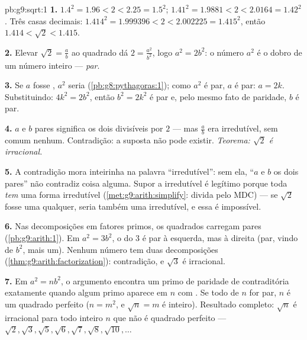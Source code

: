 \begin{solution}{pb:g9:sqrt:1}
\textbf{1.} $1.4^2 = 1.96 < 2 < 2.25 = 1.5^2$;
$1.41^2 = 1.9881 < 2 < 2.0164 = 1.42^2$. Três casas decimais:
$1.414^2 = 1.999396 < 2 < 2.002225 = 1.415^2$, então
$1.414 < \sqrt2 < 1.415$.

\textbf{2.} Elevar $\sqrt2 = \frac ab$ ao quadrado dá
$2 = \frac{a^2}{b^2}$, logo $a^2 = 2b^2$: o número $a^2$ é o dobro de
um número inteiro --- \emph{par}.

\textbf{3.} Se $a$ fosse , $a^2$ seria 
(\cref{pb:g8:pythagoras:1}); como $a^2$ é par, $a$ é par: $a = 2k$.
Substituindo: $4k^2 = 2b^2$, então $b^2 = 2k^2$ é par e, pelo mesmo
fato de paridade, $b$ é par.

\textbf{4.} $a$ e $b$ pares significa os dois divisíveis por $2$ ---
mas $\frac ab$ era irredutível, sem  comum nenhum.
Contradição: a  suposta não pode existir. \emph{Teorema:
$\sqrt2$ é irracional.}

\textbf{5.} A contradição mora inteirinha na palavra ``irredutível'':
sem ela, ``$a$ e $b$ os dois pares'' não contradiz coisa alguma. Supor
a  irredutível é legítimo porque toda  \emph{tem} uma forma
irredutível (\cref{met:g9:arith:simplify}: divida pelo MDC) --- se
$\sqrt2$ fosse uma  qualquer, seria também uma 
irredutível, e essa é impossível.

\textbf{6.} Nas decomposições em fatores primos, os quadrados carregam
 pares (\cref{pb:g9:arith:1}). Em $a^2 = 3b^2$, o  do
$3$ é par à esquerda, mas  à direita (par, vindo de $b^2$, mais
um). Nenhum número tem duas decomposições
(\cref{thm:g9:arith:factorization}): contradição, e $\sqrt3$ é
irracional.

\textbf{7.} Em $a^2 = n b^2$, o argumento encontra um primo de
paridade de  contraditória exatamente quando algum primo
aparece em $n$ com  \emph{}. Se todo  de $n$ for
par, $n$ é um quadrado perfeito ($n = m^2$, e $\sqrt n = m$ é
inteiro). Resultado completo: $\sqrt n$ é irracional para todo inteiro
$n$ que não é quadrado perfeito ---
$\sqrt2, \sqrt3, \sqrt5, \sqrt6, \sqrt7, \sqrt8, \sqrt{10}, \dots$


\end{solution}
